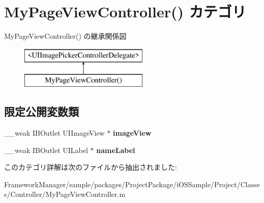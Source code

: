 \hypertarget{category_my_page_view_controller_07_08}{}\section{My\+Page\+View\+Controller() カテゴリ}
\label{category_my_page_view_controller_07_08}
My\+Page\+View\+Controller() の継承関係図\begin{figure}[H]
\begin{center}
\leavevmode
\includegraphics[height=2.000000cm]{category_my_page_view_controller_07_08}
\end{center}
\end{figure}
\subsection*{限定公開変数類}
\begin{DoxyCompactItemize}
\item 
\hypertarget{category_my_page_view_controller_07_08_a0f683fd61d943b81f8e80a73301a5fad}{}\+\_\+\+\_\+weak I\+B\+Outlet U\+I\+Image\+View $\ast$ {\bfseries image\+View}\label{category_my_page_view_controller_07_08_a0f683fd61d943b81f8e80a73301a5fad}

\item 
\hypertarget{category_my_page_view_controller_07_08_a5db58398e849661180d830453d754279}{}\+\_\+\+\_\+weak I\+B\+Outlet U\+I\+Label $\ast$ {\bfseries name\+Label}\label{category_my_page_view_controller_07_08_a5db58398e849661180d830453d754279}

\end{DoxyCompactItemize}


このカテゴリ詳解は次のファイルから抽出されました\+:\begin{DoxyCompactItemize}
\item 
Framework\+Manager/sample/packages/\+Project\+Package/i\+O\+S\+Sample/\+Project/\+Classes/\+Controller/My\+Page\+View\+Controller.\+m\end{DoxyCompactItemize}
